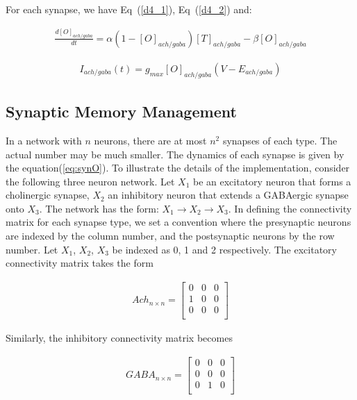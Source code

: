 \documentclass[10pt,letterpaper]{article}
\begin{document}
\begin{nolinenumbers}
For each synapse, we have Eq~(\ref{d4_1}), Eq~(\ref{d4_2}) and:

\begin{eqnarray}
\frac{d[O]_{ach/gaba}}{dt} = \alpha (1-[O]_{ach/gaba})[T]_{ach/gaba}-\beta[O]_{ach/gaba}
\label{eq:synO}
\end{eqnarray}

\begin{eqnarray}
I_{ach/gaba}(t)=g_{max}[O]_{ach/gaba}(V−E_{ach/gaba})
\label{eq:Isyn}
\end{eqnarray}

\subsection*{Synaptic Memory Management}

In a network with $n$ neurons, there are at most $n^2$ synapses of each type. The actual number may be much smaller. The dynamics of each synapse is given by the equation(\ref{eq:synO}). To illustrate the details of the implementation, consider the following three neuron network. Let $X_1$ be an excitatory neuron that forms a cholinergic synapse, $X_2$ an inhibitory neuron that extends a GABAergic synapse onto $X_3$. The network has the form: $X_1\rightarrow X_2\rightarrow X_3$. In defining the connectivity matrix for each synapse type, we set a convention where the presynaptic neurons are indexed by the column number, and the postsynaptic neurons by the row number. Let $X_1$, $X_2$, $X_3$ be indexed as 0, 1 and 2 respectively. The excitatory connectivity matrix takes the form

\begin{eqnarray}
Ach_{n\times n}=
\begin{bmatrix}
0&0&0\\
1&0&0\\
0&0&0\\
\end{bmatrix}
\end{eqnarray}

Similarly, the inhibitory connectivity matrix becomes

\begin{eqnarray}
GABA_{n\times n}=
\begin{bmatrix}
0&0&0\\
0&0&0\\
0&1&0\\
\end{bmatrix}
\end{eqnarray}


\end{nolinenumbers}
\end{document}
